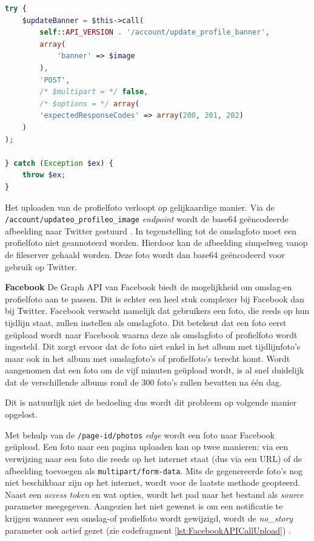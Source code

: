 \begin{lstlisting}[caption={Uploaden van omslagfoto naar Twitter},label=lst:TwitterAPICall,language=PHP]
try {
	$updateBanner = $this->call(
		self::API_VERSION . '/account/update_profile_banner',
		array(
			'banner' => $image
		),
		'POST',
    	/* $multipart = */ false,
		/* $options = */ array(
		'expectedResponseCodes' => array(200, 201, 202)
	)
);

} catch (Exception $ex) {
	throw $ex;
}
\end{lstlisting}

Het uploaden van de profielfoto verloopt op gelijkaardige manier. Via de \texttt{/account/updateo{\_}profileo{\_}image} \textit{endpoint} wordt de base64 ge\"{e}ncodeerde afbeelding naar Twitter gestuurd \cite{TwitterAPIDoc}. In tegenstelling tot de omslagfoto moet een profielfoto niet geannoteerd worden. Hierdoor kan de afbeelding simpelweg vanop de fileserver gehaald worden. Deze foto wordt dan base64 ge\"{e}ncodeerd voor gebruik op Twitter.

\textbf{Facebook} \break
De Graph API van Facebook biedt de mogelijkheid om omslag-en profielfoto aan te passen. Dit is echter een heel stuk complexer bij Facebook dan bij Twitter. %
Facebook verwacht namelijk dat gebruikers een foto, die reeds op hun tijdlijn staat, zullen instellen als omslagfoto. Dit betekent dat een foto eerst ge\"{u}pload wordt naar Facebook waarna deze als omslagfoto of profielfoto wordt ingesteld. Dit zorgt ervoor dat de foto niet enkel in het album met tijdlijnfoto's maar ook in het album met omslagfoto's of profielfoto's terecht komt. Wordt aangenomen dat een foto om de vijf minuten ge\"{u}pload wordt, is al snel duidelijk dat de verschillende albums rond de 300 foto's zullen bevatten na \'{e}\'{e}n dag. 

Dit is natuurlijk niet de bedoeling dus wordt dit probleem op volgende manier opgelost. %

Met behulp van de \texttt{/page-id/photos} \textit{edge} wordt een foto naar Facebook ge\"{u}pload. Een foto naar een pagina uploaden kan op twee manieren: via een verwijzing naar een foto die reeds op het internet staat (dus via een URL) of de afbeelding toevoegen als \texttt{multipart/form-data}. Mits de gegenereerde foto's nog niet beschikbaar zijn op het internet, wordt voor de laatste methode geopteerd. Naast een \textit{access token} en wat opties, wordt het pad naar het bestand als \textit{source} parameter meegegeven. Aangezien het niet gewenst is om een notificatie te krijgen wanneer een omslag-of profielfoto wordt gewijzigd, wordt de \textit{no{\_}story} parameter ook actief gezet (zie codefragment \ref{lst:FacebookAPICallUpload}) \cite{FacebookPagePhotos}. 

